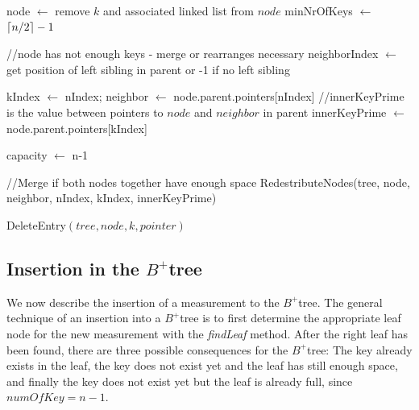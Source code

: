 \documentclass[abstracton,12pt,oneside]{scrreprt}
\DeclarePairedDelimiter\ceil{\lceil}{\rceil}
\begin{document}
\begin{algorithm}[H]
	\IncMargin{1em}
	\SetAlgoLined
	\DontPrintSemicolon


		node $\leftarrow$ remove $k$ and associated linked list from $node$\; 
		{
			minNrOfKeys $\leftarrow$ $\ceil{n/2}-1$\;
		}
			
		
		//node has not enough keys - merge or rearranges necessary\; 
		neighborIndex $\leftarrow$ get position of left sibling in parent or -1 if no left sibling\;
		
		{
			kIndex $\leftarrow$ nIndex; \;
			neighbor $\leftarrow$ node.parent.pointers[nIndex]\;
		}
		//innerKeyPrime is the value between pointers to $node$ and $neighbor$ in parent\;
		innerKeyPrime $\leftarrow$ node.parent.pointers[kIndex]
		
		capacity $\leftarrow$ n-1\;	
	

		//Merge if both nodes together have enough space\;
		 {
		  	RedestributeNodes(tree, node, neighbor, nIndex, kIndex, innerKeyPrime)\;
		}   
	
	

	\caption{DeleteEntry$(tree, node, k, pointer)$}	\label{deleteEntry}
\end{algorithm}


\newpage
\subsection{Insertion in the $B^+$tree}
\label{insertionTree}
We now describe the insertion of a measurement to the $B^+$tree. The general technique of an insertion into a $B^+$tree is to first determine the appropriate leaf node for the new measurement with the \emph{findLeaf} method. After the right leaf has been found, there are three possible consequences for the $B^+$tree: The key already exists in the leaf, the key does not exist yet and the leaf has still enough space, and finally the key does not exist yet but the leaf is already full, since $numOfKey = n-1$. 
\end{document}
